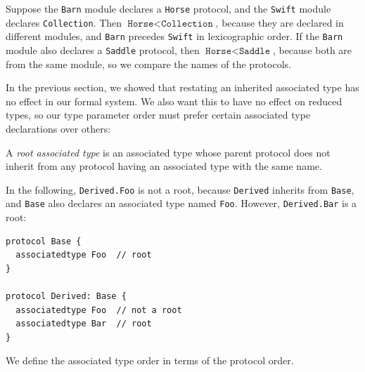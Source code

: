 \documentclass[../generics]{subfiles}
\begin{document}
Suppose the \texttt{Barn} module declares a \texttt{Horse} protocol, and the \texttt{Swift} module declares \texttt{Collection}. Then $\texttt{Horse} < \texttt{Collection}$, because they are declared in different modules, and \texttt{Barn} precedes \texttt{Swift} in lexicographic order. If the \texttt{Barn} module also declares a \texttt{Saddle} protocol, then $\texttt{Horse}<\texttt{Saddle}$, because both are from the same module, so we compare the names of the protocols.

In the previous section, we showed that restating an inherited associated type has no effect in our formal system. We also want this to have no effect on reduced types, so our type parameter order must prefer certain associated type declarations over others:

\begin{definition}\label{root associated type} A \emph{root associated type} is an associated type whose parent protocol does not inherit from any protocol having an associated type with the same name.
\end{definition}

In the following, \texttt{Derived.Foo} is not a root, because \texttt{Derived} inherits from \texttt{Base}, and \texttt{Base} also declares an associated type named \texttt{Foo}. However, \texttt{Derived.Bar} is a root:
\begin{Verbatim}
protocol Base {
  associatedtype Foo  // root
}

protocol Derived: Base {
  associatedtype Foo  // not a root
  associatedtype Bar  // root
}
\end{Verbatim}

We define the associated type order in terms of the protocol order.
\end{document}
